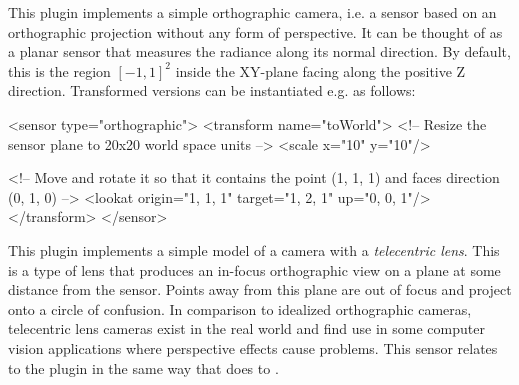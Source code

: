 This plugin implements a simple orthographic camera, i.e. a sensor
based on an orthographic projection without any form of perspective.
It can be thought of as a planar sensor that measures the radiance
along its normal direction. By default, this is the region $[-1, 1]^2$ inside
the XY-plane facing along the positive Z direction. Transformed versions
can be instantiated e.g. as follows:

\begin{xml}
<sensor type="orthographic">
    <transform name="toWorld">
        <!-- Resize the sensor plane to 20x20 world space units -->
        <scale x="10" y="10"/>

        <!-- Move and rotate it so that it contains the point
             (1, 1, 1) and faces direction (0, 1, 0) -->
        <lookat origin="1, 1, 1" target="1, 2, 1" up="0, 0, 1"/>
    </transform>
</sensor>
\end{xml}

This plugin implements a simple model of a camera with a \emph{telecentric lens}.
This is a type of lens that produces an in-focus orthographic view on a
plane at some distance from the sensor. Points away from this plane are out of focus
and project onto a circle of confusion. In comparison to idealized orthographic cameras,
telecentric lens cameras exist in the real world and find use in some computer
vision applications where perspective effects cause problems.
This sensor relates to the  plugin in the same way
that  does to .


